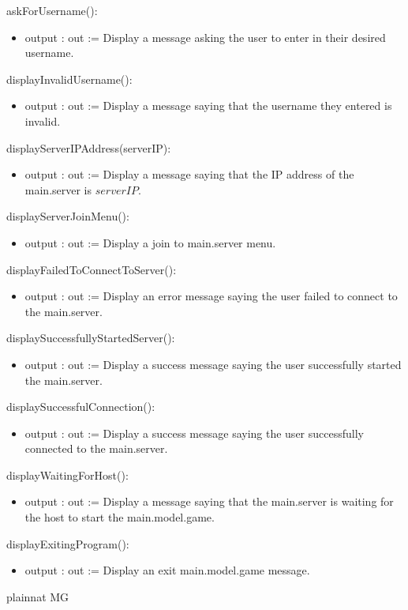 \documentclass[12pt, titlepage]{article}
\begin{document}
        \noindent askForUsername():
        \begin{itemize}
        \item output : out := Display a message asking the user to enter in their desired username.
        \end{itemize}
        
        \noindent displayInvalidUsername():
        \begin{itemize}
        \item output : out := Display a message saying that the username they entered is invalid.
        \end{itemize}
        
        \noindent displayServerIPAddress(serverIP):
        \begin{itemize}
        \item output : out := Display a message saying that the IP address of the main.server is $serverIP$.
        \end{itemize}
        
        \noindent displayServerJoinMenu():
        \begin{itemize}
        \item output : out := Display a join to main.server menu.
        \end{itemize}
        
        \noindent displayFailedToConnectToServer():
        \begin{itemize}
        \item output : out := Display an error message saying the user failed to connect to the main.server.
        \end{itemize}
        
        \noindent displaySuccessfullyStartedServer():
        \begin{itemize}
        \item output : out := Display a success message saying the user successfully started the main.server.
        \end{itemize}
        
        \noindent displaySuccessfulConnection():
        \begin{itemize}
        \item output : out := Display a success message saying the user successfully connected to the main.server.
        \end{itemize}
        
        \noindent displayWaitingForHost():
        \begin{itemize}
        \item output : out := Display a message saying that the main.server is waiting for the host to start the main.model.game.
        \end{itemize}
        
        \noindent displayExitingProgram():
        \begin{itemize}
        \item output : out := Display an exit main.model.game message.
        \end{itemize}
        
 {plainnat}
 {MG}
\end{document}
